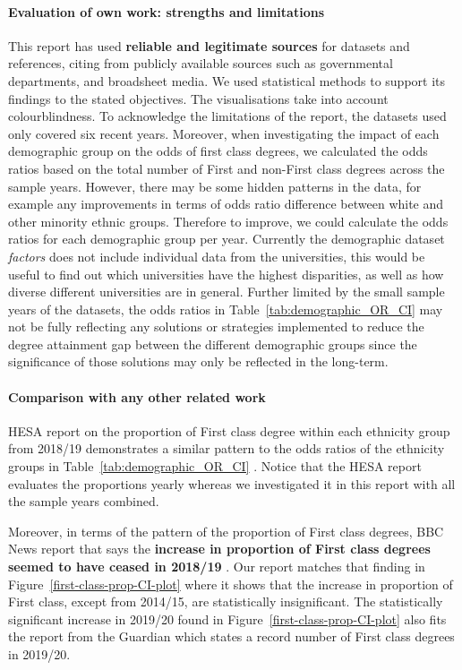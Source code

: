 \documentclass[11pt,a4paper]{article}
\begin{document}
\paragraph{Evaluation of own work: strengths and limitations}
This report has used \textbf{reliable and legitimate sources} for datasets and references, citing from publicly available sources such as governmental departments, and broadsheet media. We used statistical methods to support its findings to the stated objectives. The visualisations take into account colourblindness. To acknowledge the limitations of the report, the datasets used only covered six recent years.
Moreover, when investigating the impact of each demographic group on the odds of first class degrees, we calculated the odds ratios based on the total number of First and non-First class degrees across the sample years. However, there may be some hidden patterns in the data, for example any improvements in terms of odds ratio difference between white and other minority ethnic groups. Therefore to improve, we could calculate the odds ratios for each demographic group per year. Currently the demographic dataset \textit{factors} does not include individual data from the universities, this would be useful to find out which universities have the highest disparities, as well as how diverse different universities are in general. Further limited by the small sample years of the datasets, the odds ratios in Table~\ref{tab:demographic_OR_CI} may not be fully reflecting any solutions or strategies implemented to reduce the degree attainment gap between the different demographic groups since the significance of those solutions may only be reflected in the long-term. 

\paragraph{Comparison with any other related work}
HESA report on the proportion of First class degree within each ethnicity group from 2018/19 demonstrates a similar pattern to the odds ratios of the ethnicity groups in Table~\ref{tab:demographic_OR_CI} \cite{HESA_UG_degree_results_2020}. Notice that the HESA report evaluates the proportions yearly whereas we investigated it in this report with all the sample years combined.

Moreover, in terms of the pattern of the proportion of First class degrees, BBC News report that says the \textbf{increase in proportion of First class degrees seemed to have ceased in 2018/19} \cite{BBC_grade_inflation}. Our report matches that finding in Figure~\ref{first-class-prop-CI-plot} where it shows that the increase in proportion of First class, except from 2014/15, are statistically insignificant. The statistically significant increase in 2019/20 found in Figure~\ref{first-class-prop-CI-plot} also fits the report from the Guardian which states a record number of First class degrees in 2019/20.
\end{document}
